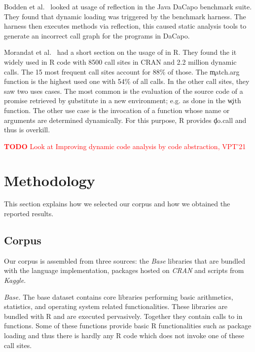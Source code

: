 \documentclass[screen,acmsmall]{acmart}
\newcommand{\mypara}[1]{\medskip\noindent\emph{#1}\xspace}
\newcommand{\authorcomment}[3]{\xspace\textcolor{#1}{{\bf #2} #3}\xspace}
\newcommand{\todo}[1]{\authorcomment{red}{TODO}{#1}}
\begin{document}
Bodden et al.~\cite{bodden} looked at usage of reflection in the Java
DaCapo benchmark suite. They found that dynamic loading was triggered
by the benchmark harness. The harness then executes methods via
reflection, this caused static analysis tools to generate an incorrect
call graph for the programs in DaCapo.

Morandat et al.~\cite{ecoop12} had a short section on the usage of
\eval in R. They found the it widely used in R code with 8500 call
sites in CRAN and 2.2 million dynamic calls. The 15 most frequent call
sites account for 88\% of those. The \c{match.arg} function is the
highest used one with 54\% of all calls. In the other call sites, they
saw two uses cases. The most common is the evaluation of the source
code of a promise retrieved by \c{substitute} in a new environment;
e.g. as done in the \c{with} function. The other use case is the
invocation of a function whose name or arguments are determined
dynamically. For this purpose, R provides \c{do.call} and thus \eval
is overkill.

\todo{Look at Improving dynamic code analysis by code abstraction, VPT'21}

\newpage
\section{Methodology}

This section explains how we selected our corpus and how we obtained the
reported results.

\subsection{Corpus}

Our corpus is assembled from three sources: the \emph{Base} libraries that are
bundled with the language implementation, packages hosted on \emph{CRAN} and
scripts from \emph{Kaggle}.

\mypara{Base.} The base dataset contains \BasePackages core libraries
performing basic arithmetics, statistics, and operating system related
functionalities. These libraries are bundled with R and are executed
pervasively. Together they contain \BaseEvalCallSites calls to \eval in
\BaseFunsWithEvals functions. Some of these functions provide basic R
functionalities such as package loading and thus there is hardly any R code
which does not invoke one of these \eval call sites.
\end{document}
